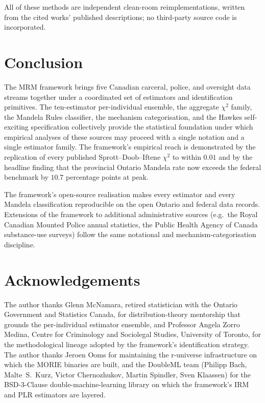 \documentclass[article,shortnames,nojss]{jss}
\begin{document}
All of these methods are independent clean-room reimplementations,
written from the cited works' published descriptions; no third-party
source code is incorporated.

\section{Conclusion}
\label{sec:conclusion}

The MRM framework brings five Canadian carceral, police, and
oversight data streams together under a coordinated set of
estimators and identification primitives. The ten-estimator
per-individual ensemble, the aggregate $\chi^{2}$ family, the
Mandela Rules classifier, the mechanism categorisation, and the
Hawkes self-exciting specification collectively provide the
statistical foundation under which empirical analyses of these
sources may proceed with a single notation and a single estimator
family. The framework's empirical reach is demonstrated by the
replication of every published Sprott--Doob--Iftene $\chi^{2}$ to
within $0.01$ and by the headline finding that the provincial
Ontario Mandela rate now exceeds the federal benchmark by $10.7$
percentage points at peak.

The framework's open-source realisation makes every estimator
and every Mandela classification reproducible on the open
Ontario and federal data records.
Extensions of the framework to additional administrative sources
(e.g.\ the Royal Canadian Mounted Police annual statistics, the
Public Health Agency of Canada substance-use surveys) follow the
same notational and mechanism-categorisation discipline.

\section*{Acknowledgements}

The author thanks Glenn McNamara, retired statistician with the
Ontario Government and Statistics Canada, for distribution-theory
mentorship that grounds the per-individual estimator ensemble, and
Professor Angela Zorro Medina, Centre for Criminology and
Sociolegal Studies, University of Toronto, for the methodological
lineage adopted by the framework's identification strategy. The
author thanks Jeroen Ooms for maintaining the r-universe
infrastructure on which the MORIE  binaries are built,
and the DoubleML team (Philipp Bach, Malte~S.\ Kurz, Victor
Chernozhukov, Martin Spindler, Sven Klaassen) for the BSD-3-Clause
double-machine-learning library on which the framework's IRM and
PLR estimators are layered.
\end{document}
